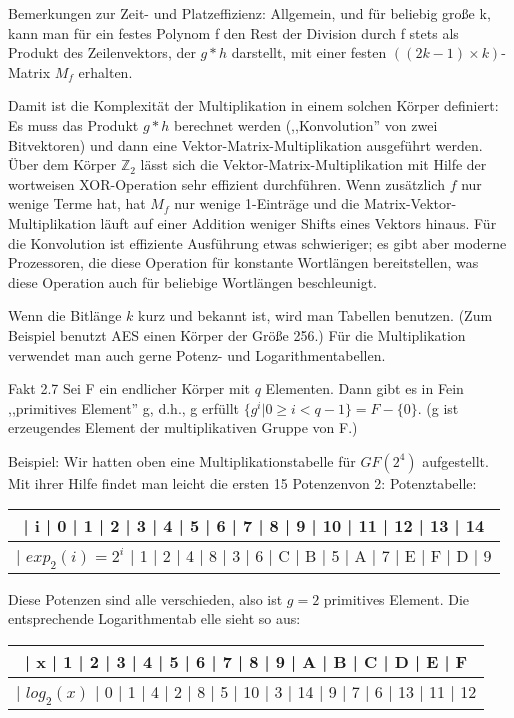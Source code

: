 \documentclass[a4paper]{article}
\begin{document}
\begin{multicols}{3}
    Bemerkungen zur Zeit- und Platzeffizienz: Allgemein, und für beliebig große k, kann man für ein festes Polynom f den Rest der Division durch f stets als Produkt des Zeilenvektors, der $g*h$ darstellt, mit einer festen $((2k-1)\times k)$-Matrix $M_f$ erhalten.

    Damit ist die Komplexität der Multiplikation in einem solchen Körper definiert: Es muss das Produkt $g*h$ berechnet werden (,,Konvolution'' von zwei Bitvektoren) und dann eine Vektor-Matrix-Multiplikation ausgeführt werden. Über dem Körper $\mathbb{Z}_2$ lässt sich die Vektor-Matrix-Multiplikation mit Hilfe der wortweisen XOR-Operation sehr effizient durchführen. Wenn zusätzlich $f$ nur wenige Terme hat, hat $M_f$ nur wenige 1-Einträge und die Matrix-Vektor-Multiplikation läuft auf einer Addition weniger Shifts eines Vektors hinaus. Für die Konvolution ist effiziente Ausführung etwas schwieriger; es gibt aber moderne Prozessoren, die diese Operation für konstante Wortlängen bereitstellen, was diese Operation auch für beliebige Wortlängen beschleunigt.

    Wenn die Bitlänge $k$ kurz und bekannt ist, wird man Tabellen benutzen. (Zum Beispiel benutzt AES einen Körper der Größe 256.) Für die Multiplikation verwendet man auch gerne Potenz- und Logarithmentabellen.

    Fakt 2.7 Sei F ein endlicher Körper mit $q$ Elementen. Dann gibt es in Fein ,,primitives Element'' g, d.h., g erfüllt $\{g^i| 0 \geq i < q-1\}=F-\{0\}$. (g ist erzeugendes Element der multiplikativen Gruppe von F.)

    Beispiel: Wir hatten oben eine Multiplikationstabelle für $GF(2^4)$ aufgestellt. Mit ihrer Hilfe findet man leicht die ersten 15 Potenzenvon 2:
    Potenztabelle:
    \begin{tabular}{c}
    | i       | 0  | 1  | 2  | 3  | 4  | 5  | 6  | 7  | 8  | 9  | 10 | 11 | 12 | 13 | 14 \\\hline
    | $exp_2(i)=2^i$ | 1  | 2  | 4  | 8  | 3  | 6  | C  | B  | 5  | A  | 7  | E  | F  | D  | 9  
    \end{tabular}

    Diese Potenzen sind alle verschieden, also ist $g=2$ primitives Element. Die entsprechende Logarithmentab elle sieht so aus:
    \begin{tabular}{c}
    | x     | 1  | 2  | 3  | 4  | 5  | 6  | 7  | 8  | 9  | A  | B  | C  | D  | E  | F  \\\hline
    | $log_2(x)$ | 0  | 1  | 4  | 2  | 8  | 5  | 10 | 3  | 14 | 9  | 7  | 6  | 13 | 11 | 12 
    \end{tabular}


\end{multicols}
\end{document}
